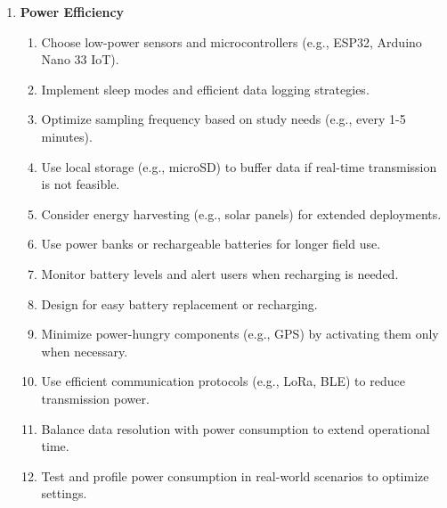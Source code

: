 \documentclass[12pt,a4paper]{article}
\begin{document}
\begin{enumerate}
    \item \textbf{Power Efficiency}
          \begin{enumerate}
              \item Choose low-power sensors and microcontrollers (e.g., ESP32, Arduino Nano 33 IoT).
              \item Implement sleep modes and efficient data logging strategies.
              \item Optimize sampling frequency based on study needs (e.g., every 1-5 minutes).
              \item Use local storage (e.g., microSD) to buffer data if real-time transmission is not feasible.
              \item Consider energy harvesting (e.g., solar panels) for extended deployments.
              \item Use power banks or rechargeable batteries for longer field use.
              \item Monitor battery levels and alert users when recharging is needed.
              \item Design for easy battery replacement or recharging.
              \item Minimize power-hungry components (e.g., GPS) by activating them only when necessary.
              \item Use efficient communication protocols (e.g., LoRa, BLE) to reduce transmission power.
              \item Balance data resolution with power consumption to extend operational time.
              \item Test and profile power consumption in real-world scenarios to optimize settings.
          \end{enumerate}



\end{enumerate}
\end{document}

